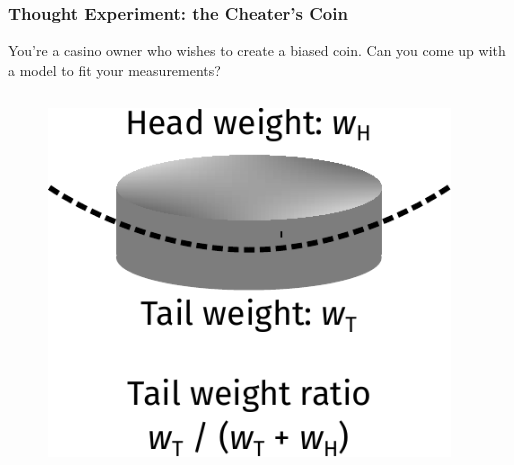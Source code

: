 \documentclass[10pt,aspectratio=169]{beamer}
\begin{document}
\begin{frame}
  \frametitle{Thought Experiment: the Cheater’s Coin}
  
  You're a casino owner who wishes to create a biased coin. Can you
  come up with a model to fit your measurements?

  \vfill
  \begin{columns}[T]
    \begin{column}{0.20\textwidth}
      \begin{figure}[t]
        \includegraphics[width=\textwidth]{images/coin.pdf}
      \end{figure}
    \end{column}
    \begin{column}{0.75\textwidth}
    \end{column}
  \end{columns}

\end{frame}
\end{document}
